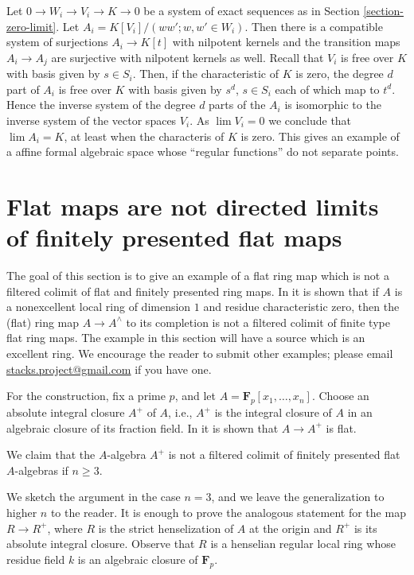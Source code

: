 \medskip\noindent
Let $0 \to W_i \to V_i \to K \to 0$ be a system of exact sequences
as in Section \ref{section-zero-limit}. Let
$A_i = K[V_i]/(ww'; w, w' \in W_i)$.
Then there is a compatible system of surjections $A_i \to K[t]$
with nilpotent kernels and
the transition maps $A_i \to A_j$ are surjective with nilpotent
kernels as well. Recall that $V_i$ is free over $K$ with
basis given by $s \in S_i$. Then, if the characteristic of $K$ is zero,
the degree $d$ part of $A_i$ is free over $K$ with basis given by
$s^d$, $s \in S_i$ each of which map to $t^d$. Hence the inverse system of
the degree $d$ parts of the $A_i$ is isomorphic to the inverse
system of the vector spaces $V_i$. As $\lim V_i = 0$ we conclude that
$\lim A_i = K$, at least when the characteris of $K$ is zero.
This gives an example of a affine formal algebraic space
whose ``regular functions'' do not separate points.




\section{Flat maps are not directed limits of finitely presented flat maps}
\label{section-flat-not-colimit-flat-finitely-presented}

\noindent
The goal of this section is to give an example of a flat ring map which
is not a filtered colimit of flat and finitely presented ring maps. In
\cite{gabber-nonexcellent} it is shown that if $A$ is a nonexcellent
local ring of dimension $1$ and residue characteristic zero, then the
(flat) ring map $A \to A^\wedge$ to its completion is not a filtered
colimit of finite type flat ring maps. The example in this section
will have a source which is an excellent ring. We encourage the reader
to submit other examples; please email
\href{mailto:stacks.project@gmail.com}{stacks.project@gmail.com}
if you have one.

\medskip\noindent
For the construction, fix a prime $p$, and let
$A = \mathbf{F}_p[x_1, \ldots, x_n]$.
Choose an absolute integral closure $A^+$ of $A$, i.e., $A^+$ is the
integral closure of $A$ in an algebraic closure of its fraction field.
In \cite[\S 6.7]{HHBigCM} it is shown that $A \to A^+$ is flat.

\medskip\noindent
We claim that the $A$-algebra $A^+$ is not a filtered colimit of finitely
presented flat $A$-algebras if $n \geq 3$.

\medskip\noindent
We sketch the argument in the case $n = 3$, and we leave the generalization to
higher $n$ to the reader. It is enough to prove the analogous statement for
the map $R \to R^+$, where $R$ is the strict henselization of $A$ at the
origin and $R^+$ is its absolute integral closure. Observe that $R$
is a henselian regular local ring whose residue field $k$ is an
algebraic closure of $\mathbf{F}_p$.

